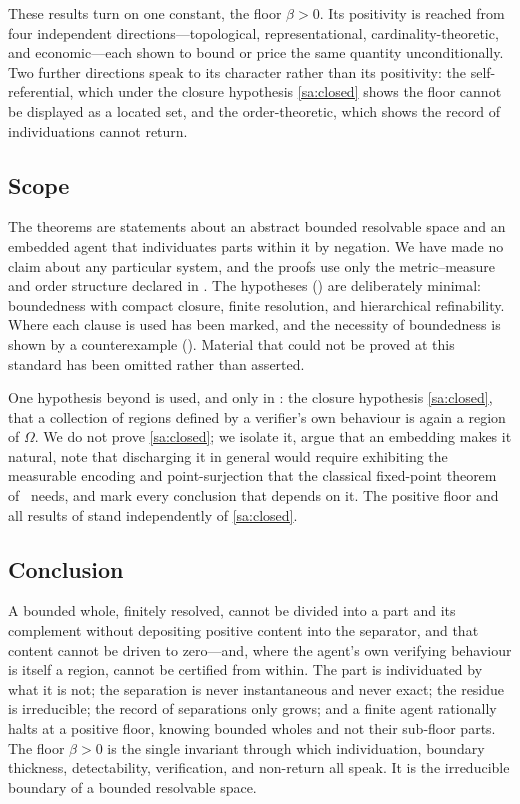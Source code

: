 \documentclass[11pt,a4paper]{article}
\theoremstyle{thmstyle}
\theoremstyle{definition}
\theoremstyle{remark}
\newcommand{\Space}{\Omega}
\newcommand{\thick}{\beta}
\begin{document}
These results turn on one constant, the floor $\thick>0$. Its positivity is
reached from four independent directions---topological, representational,
cardinality-theoretic, and economic---each shown to bound or price the same
quantity unconditionally. Two further directions speak to its character rather
than its positivity: the self-referential, which under the closure hypothesis
\ref{sa:closed} shows the floor cannot be displayed as a located set, and the
order-theoretic, which shows the record of individuations cannot return.

\subsection{Scope}

The theorems are statements about an abstract bounded resolvable space and an
embedded agent that individuates parts within it by negation. We have made no
claim about any particular system, and the proofs use only the metric--measure
and order structure declared in . The hypotheses
() are deliberately minimal: boundedness with compact closure,
finite resolution, and hierarchical refinability. Where each clause is used has
been marked, and the necessity of boundedness is shown by a counterexample
(). Material that could not be proved at this standard
has been omitted rather than asserted.

One hypothesis beyond  is used, and only in : the
closure hypothesis \ref{sa:closed}, that a collection of regions defined by a
verifier's own behaviour is again a region of $\Space$. We do not prove
\ref{sa:closed}; we isolate it, argue that an embedding makes it natural, note
that discharging it in general would require exhibiting the measurable encoding
and point-surjection that the classical fixed-point theorem of~\citet{lawvere1969}
needs, and mark every conclusion that depends on it. The positive floor and all
results of 
stand independently of \ref{sa:closed}.

\subsection{Conclusion}

A bounded whole, finitely resolved, cannot be divided into a part and its
complement without depositing positive content into the separator, and that
content cannot be driven to zero---and, where the agent's own verifying behaviour
is itself a region, cannot be certified from within. The part is
individuated by what it is not; the separation is never instantaneous and never
exact; the residue is irreducible; the record of separations only grows; and a
finite agent rationally halts at a positive floor, knowing bounded wholes and not
their sub-floor parts. The floor $\thick>0$ is the single invariant through which
individuation, boundary thickness, detectability, verification, and non-return
all speak. It is the irreducible boundary of a bounded resolvable space.



\end{document}
